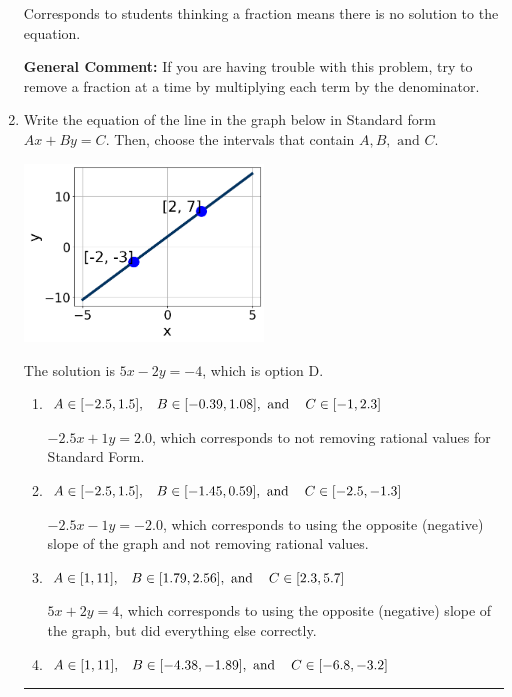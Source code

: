 \documentclass{extbook}[14pt]
\newcommand{\litem}[1]{\item #1

\rule{\textwidth}{0.4pt}}
\begin{document}
\begin{enumerate}
{\begin{enumerate}[label=\Alph*.]
Corresponds to students thinking a fraction means there is no solution to the equation.
\end{enumerate}

\textbf{General Comment:} If you are having trouble with this problem, try to remove a fraction at a time by multiplying each term by the denominator.
}
\litem{
Write the equation of the line in the graph below in Standard form $Ax+By=C$. Then, choose the intervals that contain $A, B, \text{ and } C$.

\begin{center}
    \includegraphics[width=0.5\textwidth]{../Figures/linearGraphToStandardCopyC.png}
\end{center}


The solution is \( 5x - 2y = -4 \), which is option D.\begin{enumerate}[label=\Alph*.]
\item \( A \in [-2.5, 1.5], \hspace{3mm} B \in [-0.39, 1.08], \text{ and } \hspace{3mm} C \in [-1, 2.3] \)

 $-2.5x + 1y = 2.0$, which corresponds to not removing rational values for Standard Form.
\item \( A \in [-2.5, 1.5], \hspace{3mm} B \in [-1.45, 0.59], \text{ and } \hspace{3mm} C \in [-2.5, -1.3] \)

 $-2.5x - 1y = -2.0$, which corresponds to using the opposite (negative) slope of the graph and not removing rational values.
\item \( A \in [1, 11], \hspace{3mm} B \in [1.79, 2.56], \text{ and } \hspace{3mm} C \in [2.3, 5.7] \)

 $5x + 2y = 4$, which corresponds to using the opposite (negative) slope of the graph, but did everything else correctly.
\item \( A \in [1, 11], \hspace{3mm} B \in [-4.38, -1.89], \text{ and } \hspace{3mm} C \in [-6.8, -3.2] \)


\end{enumerate}}
\end{enumerate}
\end{document}
